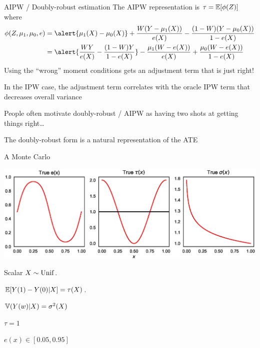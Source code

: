 \documentclass[10pt,aspectratio=169,handout]{beamer}
\theoremstyle{definition}
\begin{document}
\begin{frame}{AIPW / Doubly-robust estimation}
  The AIPW representation is $\tau = \mathbb{E}[\phi(Z)]$ where \begin{align*}
    \phi(Z, \mu_1,\mu_0,e) &= \alert{\mu_1(X) - \mu_0(X)} + \frac{W(Y-\mu_1
    (X))}{e(X)}
  - \frac{(1-W)
  (Y-\mu_0(X))}{1-e(X)} \\ 
  &= \alert{\frac{WY}{e(X)} - \frac{(1-W)Y}{1-e(X)}} - \frac{\mu_1(W-e(X))}
  {e(X)} +
  \frac{\mu_0(W-e(X))}{1-e(X)}
  \end{align*}
  Using the ``wrong'' moment conditions gets an adjustment term  that is
  just right! 
  
  In the IPW case, the adjustment term correlates with the oracle IPW term that
  decreases overall variance
  
  \begin{rmk}[Editorializing]
    People often motivate doubly-robust / AIPW as having two shots at
    getting things right\ldots 
    
    The doubly-robust form is a natural
    representation of the ATE
  \end{rmk}
  
  
\end{frame}

\begin{frame}{A Monte Carlo}

  
  \begin{center}
    \includegraphics[height=0.5\textheight]{design_simple.eps}
  \end{center}
  
  Scalar $X \sim \operatorname{Unif}$. 
  
  $\mathbb{E}[Y(1)-Y(0)|X] = \tau(X)$. 
  
  $\mathbb{V}(Y(w) | X) =
  \sigma^2(X)$
  
  $\tau = 1$
  
  $e(x) \in [0.05,0.95]$
\end{frame}
\end{document}
